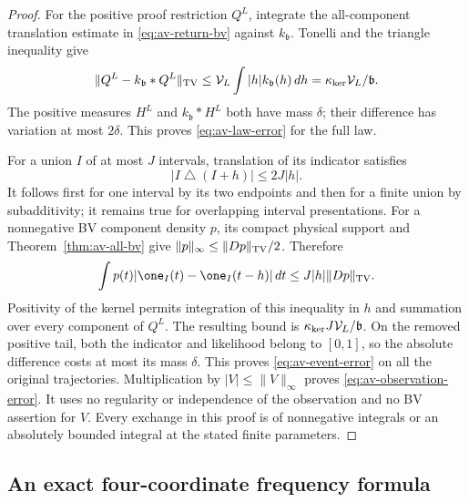 \begin{proof}
For the positive proof restriction $Q^L$, integrate the all-component
translation estimate in \eqref{eq:av-return-bv} against
$k_{\mathfrak b}$.  Tonelli and the triangle inequality give
\[
 \|Q^L-k_{\mathfrak b}*Q^L\|_{\rm TV}
 \le\mathcal V_L\int|h|k_{\mathfrak b}(h)\,dh
 =\kappa_{\rm ker}\mathcal V_L/\mathfrak b.
\]
The positive measures $H^L$ and $k_{\mathfrak b}*H^L$ both have
mass $\delta$; their difference has variation at most $2\delta$.
This proves \eqref{eq:av-law-error} for the full law.

For a union $I$ of at most $J$ intervals, translation of its
indicator satisfies
\[
 |I\mathbin\triangle(I+h)|\le2J|h|.
\]
It follows first for one interval by its two endpoints and then
for a finite union by subadditivity; it remains true for overlapping
interval presentations.  For a nonnegative BV component density
$p$, its compact physical support and Theorem~\ref{thm:av-all-bv} give
$\|p\|_\infty\le\|Dp\|_{\rm TV}/2$.  Therefore
\[
 \int p(t)|\one_I(t)-\one_I(t-h)|\,dt
             \le J|h|\|Dp\|_{\rm TV}.
\]
Positivity of the kernel permits integration of this inequality
in $h$ and summation over every component of $Q^L$.  The resulting
bound is $\kappa_{\rm ker}J\mathcal V_L/\mathfrak b$.
On the removed positive tail, both the indicator and likelihood
belong to $[0,1]$, so the absolute difference costs at most its
mass $\delta$.  This proves \eqref{eq:av-event-error} on all the
original trajectories.  Multiplication by $|V|\le\|V\|_\infty$
proves \eqref{eq:av-observation-error}.  It uses no regularity or
independence of the observation and no BV assertion for $V$.
Every exchange in this proof is of nonnegative integrals or an
absolutely bounded integral at the stated finite parameters.
\end{proof}

\subsection{An exact four-coordinate frequency formula}

